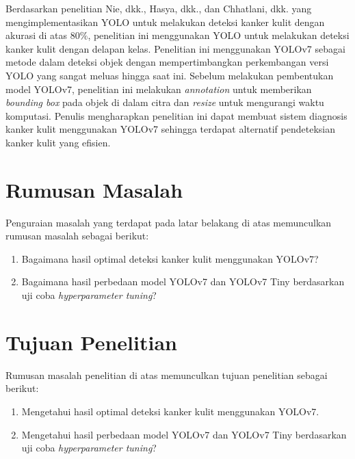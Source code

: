     Berdasarkan penelitian Nie, dkk., Hasya, dkk., dan Chhatlani, dkk. yang mengimplementasikan YOLO untuk melakukan deteksi kanker kulit dengan akurasi di atas $80\%$, penelitian ini menggunakan YOLO untuk melakukan deteksi kanker kulit dengan delapan kelas. Penelitian ini menggunakan YOLOv7 sebagai metode dalam deteksi objek dengan mempertimbangkan perkembangan versi YOLO yang sangat meluas hingga saat ini. Sebelum melakukan pembentukan model YOLOv7, penelitian ini melakukan \textit{annotation} untuk memberikan \textit{bounding box} pada objek di dalam citra dan \textit{resize} untuk mengurangi waktu komputasi. Penulis mengharapkan penelitian ini dapat membuat sistem diagnosis kanker kulit menggunakan YOLOv7 sehingga terdapat alternatif pendeteksian kanker kulit yang efisien.

    \section{Rumusan Masalah}
    Penguraian masalah yang terdapat pada latar belakang di atas memunculkan rumusan masalah sebagai berikut:
    \begin{enumerate}
        \item Bagaimana hasil optimal deteksi kanker kulit menggunakan YOLOv7?
        \item Bagaimana hasil perbedaan model YOLOv7 dan YOLOv7 Tiny berdasarkan uji coba \textit{hyperparameter tuning}?
    \end{enumerate}

    \section{Tujuan Penelitian}
    Rumusan masalah penelitian di atas memunculkan tujuan penelitian sebagai berikut:
    \begin{enumerate}
        \item Mengetahui hasil optimal deteksi kanker kulit menggunakan YOLOv7.
        \item Mengetahui hasil perbedaan model YOLOv7 dan YOLOv7 Tiny berdasarkan uji coba \textit{hyperparameter tuning}?
    \end{enumerate}


